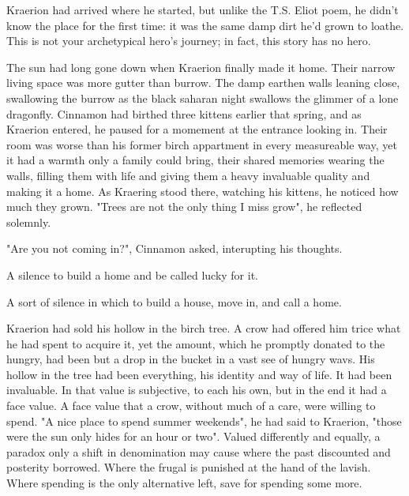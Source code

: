 
Kraerion had arrived where he started, but unlike the T.S. Eliot poem, he didn't know the place for the first time: it was the same damp dirt he'd grown to loathe. This is not your archetypical hero's journey; in fact, this story has no hero.

The sun had long gone down when Kraerion finally made it home. Their narrow living space was more gutter than burrow. The damp earthen walls leaning close, swallowing the burrow as the black saharan night swallows the glimmer of a lone dragonfly. Cinnamon had birthed three kittens earlier that spring, and as Kraerion entered, he paused for a momement at the entrance looking in. Their room was worse than his former birch appartment in every measureable way, yet it had a warmth only a family could bring, their shared memories wearing the walls, filling them with life and giving them a heavy invaluable quality and making it a home. As Kraering stood there, watching his kittens, he noticed how much they grown. "Trees are not the only thing I miss grow", he reflected solemnly.

"Are you not coming in?", Cinnamon asked, interupting his thoughts. 

A silence to build a home and be called lucky for it.

A sort of silence in which to build a house, move in, and call a home. 


 
Kraerion had sold his hollow in the birch tree. A crow had offered him trice what he had spent to acquire it, yet the amount, which he promptly donated to the hungry, had been but a drop in the bucket in a vast see of hungry wavs. 
His hollow in the tree had been everything, his identity and way of life. It had been invaluable. In that value is subjective, to each his own, but in the end it had a face value. A face value that a crow, without much of a care, were willing to spend. "A nice place to spend summer weekends", he had said to Kraerion, "those were the sun only hides for an hour or two". Valued differently and equally, a paradox only a shift in denomination may cause where the past discounted and posterity borrowed. Where the frugal is punished at the hand of the lavish. Where spending is the only alternative left, save for spending some more.



